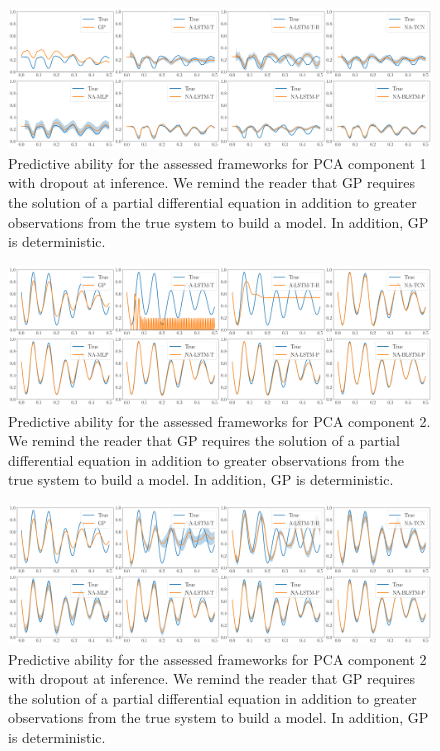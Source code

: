 \documentclass[12pt]{article}
\begin{document}
\begin{figure}[h]
    \centering
    \includegraphics[width=\textwidth]{Figure_1_do.png}
    \caption{Predictive ability for the assessed frameworks for PCA component 1 with dropout at inference. We remind the reader that GP requires the solution of a partial differential equation in addition to greater observations from the true system to build a model. In addition, GP is deterministic.}
    \label{Mode_1_do}
\end{figure}

\begin{figure}[h]
    \centering
    \includegraphics[width=\textwidth]{Figure_2.png}
    \caption{Predictive ability for the assessed frameworks for PCA component 2. We remind the reader that GP requires the solution of a partial differential equation in addition to greater observations from the true system to build a model. In addition, GP is deterministic.}
    \label{Mode_2}
\end{figure}

\begin{figure}[h]
    \centering
    \includegraphics[width=\textwidth]{Figure_2_do.png}
    \caption{Predictive ability for the assessed frameworks for PCA component 2 with dropout at inference. We remind the reader that GP requires the solution of a partial differential equation in addition to greater observations from the true system to build a model. In addition, GP is deterministic.}
    \label{Mode_2_do}
\end{figure}
\end{document}
